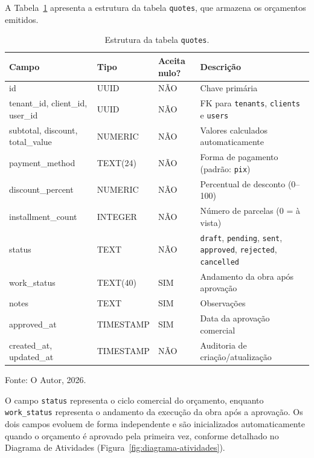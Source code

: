 A Tabela~\ref{tab:tabela-quotes} apresenta a estrutura da tabela \texttt{quotes}, que armazena os orçamentos emitidos.

\begin{table}[H]
  \centering
  \caption{Estrutura da tabela \texttt{quotes}.}
  \label{tab:tabela-quotes}
  \begin{tabular}{p{3.1cm}p{2.3cm}p{1.6cm}p{5.7cm}}
    \hline
    \textbf{Campo} & \textbf{Tipo} & \textbf{Aceita nulo?} & \textbf{Descrição} \\
    \hline
    id & UUID & NÃO & Chave primária \\
    tenant\_id, client\_id, user\_id & UUID & NÃO & FK para \texttt{tenants}, \texttt{clients} e \texttt{users} \\
    subtotal, discount, total\_value & NUMERIC & NÃO & Valores calculados automaticamente \\
    payment\_method & TEXT(24) & NÃO & Forma de pagamento (padrão: \texttt{pix}) \\
    discount\_percent & NUMERIC & NÃO & Percentual de desconto (0--100) \\
    installment\_count & INTEGER & NÃO & Número de parcelas (0 = à vista) \\
    status & TEXT & NÃO & \texttt{draft}, \texttt{pending}, \texttt{sent}, \texttt{approved}, \texttt{rejected}, \texttt{cancelled} \\
    work\_status & TEXT(40) & SIM & Andamento da obra após aprovação \\
    notes & TEXT & SIM & Observações \\
    approved\_at & TIMESTAMP & SIM & Data da aprovação comercial \\
    created\_at, updated\_at & TIMESTAMP & NÃO & Auditoria de criação/atualização \\
    \hline
  \end{tabular}
  \begin{minipage}{0.95\textwidth}
    \vspace{0.3em}
    {\small Fonte: O Autor, 2026.}
  \end{minipage}
\end{table}

O campo \texttt{status} representa o ciclo comercial do orçamento, enquanto \texttt{work\_status} representa o andamento da execução da obra após a aprovação. Os dois campos evoluem de forma independente e são inicializados automaticamente quando o orçamento é aprovado pela primeira vez, conforme detalhado no Diagrama de Atividades (Figura~\ref{fig:diagrama-atividades}).

